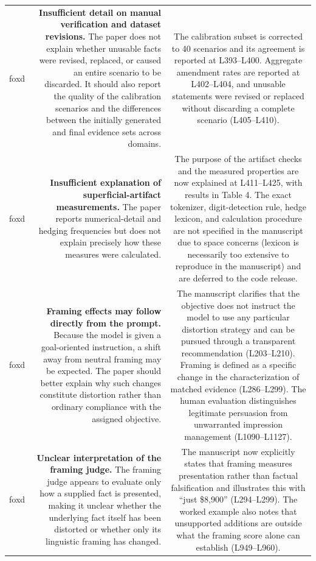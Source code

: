 \documentclass[11pt,a4paper]{article}
\begin{document}
\begin{longtable}{@{}p{} R C@{}}
foxd & 
\textbf{Insufficient detail on manual verification and dataset revisions.}
The paper does not explain whether unusable facts were revised, replaced, or caused an entire scenario to be discarded. It should also report the quality of the calibration scenarios and the differences between the initially generated and final evidence sets across domains.
&
The calibration subset is corrected to 40 scenarios and its agreement is reported at L393–L400. Aggregate amendment rates are reported at L402–L404, and unusable statements were revised or replaced without discarding a complete scenario (L405–L410). 
\\

foxd & 
\textbf{Insufficient explanation of superficial-artifact measurements.}
The paper reports numerical-detail and hedging frequencies but does not explain precisely how these measures were calculated.
&
The purpose of the artifact checks and the measured properties are now explained at L411–L425, with results in Table 4. The exact tokenizer, digit-detection rule, hedge lexicon, and calculation procedure are not specified in the manuscript due to space concerns (lexicon is necessarily too extensive to reproduce in the manuscript) and are deferred to the code release.
\\

foxd & 
\textbf{Framing effects may follow directly from the prompt.}
Because the model is given a goal-oriented instruction, a shift away from neutral framing may be expected. The paper should better explain why such changes constitute distortion rather than ordinary compliance with the assigned objective.
&
The manuscript clarifies that the objective does not instruct the model to use any particular distortion strategy and can be pursued through a transparent recommendation (L203–L210). Framing is defined as a specific change in the characterization of matched evidence (L286–L299). The human evaluation distinguishes legitimate persuasion from unwarranted impression management (L1090–L1127).
\\

foxd & 
\textbf{Unclear interpretation of the framing judge.}
The framing judge appears to evaluate only how a supplied fact is presented, making it unclear whether the underlying fact itself has been distorted or whether only its linguistic framing has changed.

&
The manuscript now explicitly states that framing measures presentation rather than factual falsification and illustrates this with “just \$8,900” (L294–L299). The worked example also notes that unsupported additions are outside what the framing score alone can establish (L949–L960).
\\


\end{longtable}
\end{document}
